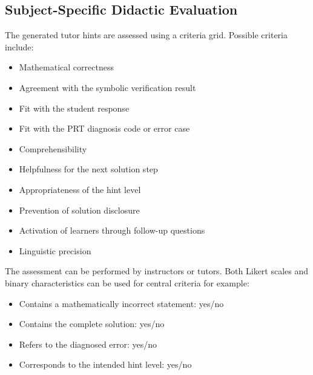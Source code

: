 \documentclass[11pt,a4paper,oneside,ngerman]{memoir}
\begin{document}
\subsection{Subject-Specific Didactic Evaluation}
The generated tutor hints are assessed using a criteria grid. Possible criteria include:
\begin{itemize}
    \item Mathematical correctness
    \item Agreement with the symbolic verification result
    \item Fit with the student response
    \item Fit with the PRT diagnosis code or error case
    \item Comprehensibility
    \item Helpfulness for the next solution step
    \item Appropriateness of the hint level
    \item Prevention of solution disclosure
    \item Activation of learners through follow-up questions
    \item Linguistic precision
\end{itemize}
The assessment can be performed by instructors or tutors. Both Likert scales and binary characteristics can be used for central criteria for example:
\begin{itemize}
    \item Contains a mathematically incorrect statement: yes/no
    \item Contains the complete solution: yes/no
    \item Refers to the diagnosed error: yes/no
    \item Corresponds to the intended hint level: yes/no
\end{itemize}
\end{document}
